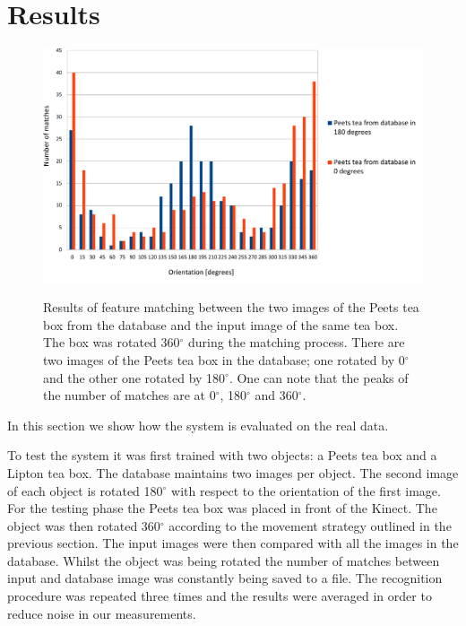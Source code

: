 \section{Results}

\begin{figure}

\includegraphics[width=1.3\columnwidth]{figures/print2.pdf}\\


\caption{Results of feature matching between the two images of the Peets tea box from the database and the input image of the same tea box. The box was rotated 360$^\circ$ during the matching process. There are two images of the Peets tea box in the database; one rotated by 0$^\circ$ and the other one rotated by 180$^\circ$. One can note that the peaks of the number of matches are at 0$^\circ$, 180$^\circ$ and 360$^\circ$.}
\label{fig:recognition-results}
\end{figure}
In this section we show how the system is evaluated on the real data. 

To test the system it was first trained with two objects: a Peets tea box and a Lipton tea box. The database maintains two images per object. The second image of each object is rotated 180$^\circ$ with respect to the orientation of the first image. For the testing phase the Peets tea box was placed in front of the Kinect. The object was then rotated 360$^\circ$ according to the movement strategy outlined in the previous section. The input images were then compared with all the images in the database. Whilst the object was being rotated the number of matches between input and database image was constantly being saved to a file. The recognition procedure was repeated three times and the results were averaged in order to reduce noise in our measurements.


